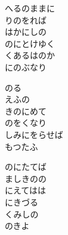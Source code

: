 \documentclass[10pt,b5j]{tarticle} %
\begin{document}
\vspace{1.5em} %
\newcommand{\linespace}{0.5em} %
\newcommand{\blocksize}{0.5\hsize} %
\begin{enumerate} %
    \begin{minipage}[c]{\blocksize}
    
        \vspace{\linespace}
        \item
        へるのままに\\
        りのをれば\\
        はかにしの\\
        のにとけゆく\\
        くあるはのか\\
        にのぶなり
        
        \vspace{\linespace}
        \item
        のる\\
        えふの\\
        きのにめて\\
        のをくなり\\
        しみにをらせば\\
        もつたふ
        
        \vspace{\linespace}
        \item
        のにたてば\\
        ましきのの\\
        にえてはは\\
        にきづる\\
        くみしの\\
        のきよ
        

\end{minipage}
\end{enumerate}
\end{document}
